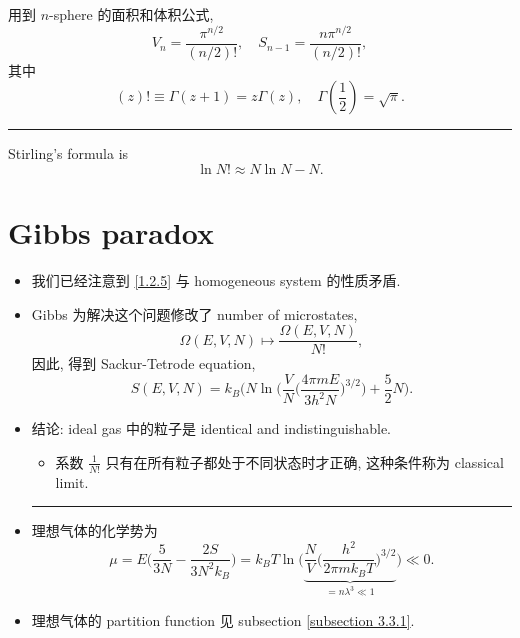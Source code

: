\begin{itemize}
	\begin{tcolorbox}[title=calculation:]
		用到 $n$-sphere 的面积和体积公式,
		\begin{equation}
			V_n = \frac{\pi^{n / 2}}{(n / 2)!}, \quad S_{n - 1} = \frac{n \pi^{n / 2}}{(n / 2)!},
		\end{equation}
		其中
		\begin{equation}
			(z)! \equiv \Gamma(z + 1) = z \Gamma(z), \quad \Gamma(\frac{1}{2}) = \sqrt{\pi}.
		\end{equation}
		
		\noindent\rule[0.5ex]{\linewidth}{0.5pt} %
		
		Stirling's formula is
		\begin{equation}
			\ln N! \approx N \ln N - N.
		\end{equation}
	\end{tcolorbox}
\end{itemize}

\section{Gibbs paradox}
\begin{itemize}
	\item 我们已经注意到 \eqref{1.2.5} 与 homogeneous system 的性质矛盾.
	
	\item Gibbs 为解决这个问题修改了 number of microstates,
	\begin{equation}
		\Omega(E, V, N) \mapsto \frac{\Omega(E, V, N)}{N!},
	\end{equation}
	因此, 得到 Sackur-Tetrode equation,
	\begin{equation}
		S(E, V, N) = k_B \bigg( N \ln \bigg( \frac{V}{N} \Big( \frac{4 \pi m E}{3 h^2 N} \Big)^{3 / 2} \bigg) + \frac{5}{2} N \bigg).
	\end{equation}
	
	\item 结论: ideal gas 中的粒子是 identical and indistinguishable.
	\begin{itemize}
		\item 系数 $\frac{1}{N!}$ 只有在所有粒子都处于不同状态时才正确, 这种条件称为 classical limit.
	\end{itemize}
	
	\noindent\rule[0.5ex]{\linewidth}{0.5pt} %
	
	\item 理想气体的化学势为
	\begin{equation} \label{1.3.3}
		\mu = E \Big( \frac{5}{3 N} - \frac{2 S}{3 N^2 k_B} \Big) = k_B T \ln \Big( \underbrace{\frac{N}{V} \Big( \frac{h^2}{2 \pi m k_B T} \Big)^{3 / 2}}_{= n \lambda^3 \ll 1} \Big) \ll 0.
	\end{equation}
	
	\item 理想气体的 partition function 见 subsection \ref{subsection 3.3.1}.
\end{itemize}

